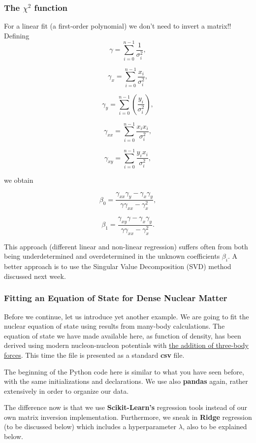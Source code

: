 \documentclass{beamer}
\begin{document}
\begin{frame}
\frametitle{The $\chi^2$ function}

\begin{block}{}

For a linear fit (a first-order polynomial) we don't need to invert a matrix!!  
Defining
\[
\gamma =  \sum_{i=0}^{n-1}\frac{1}{\sigma_i^2},
\]

\[
\gamma_x =  \sum_{i=0}^{n-1}\frac{x_{i}}{\sigma_i^2},
\]

\[
\gamma_y = \sum_{i=0}^{n-1}\left(\frac{y_i}{\sigma_i^2}\right),
\]

\[
\gamma_{xx} =  \sum_{i=0}^{n-1}\frac{x_ix_{i}}{\sigma_i^2},
\]

\[
\gamma_{xy} = \sum_{i=0}^{n-1}\frac{y_ix_{i}}{\sigma_i^2},
\]

we obtain

\[
\beta_0 = \frac{\gamma_{xx}\gamma_y-\gamma_x\gamma_y}{\gamma\gamma_{xx}-\gamma_x^2},
\]

\[
\beta_1 = \frac{\gamma_{xy}\gamma-\gamma_x\gamma_y}{\gamma\gamma_{xx}-\gamma_x^2}.
\]

This approach (different linear and non-linear regression) suffers
often from both being underdetermined and overdetermined in the
unknown coefficients $\beta_i$.  A better approach is to use the
Singular Value Decomposition (SVD) method discussed next week.

\end{block}
\end{frame}

\begin{frame}
\frametitle{Fitting an Equation of State for Dense Nuclear Matter}

Before we continue, let us introduce yet another example. We are going to fit the
nuclear equation of state using results from many-body calculations.
The equation of state we have made available here, as function of
density, has been derived using modern nucleon-nucleon potentials with
\href{{https://www.sciencedirect.com/science/article/pii/S0370157399001106}}{the addition of three-body
forces}. This
time the file is presented as a standard \textbf{csv} file.

The beginning of the Python code here is similar to what you have seen
before, with the same initializations and declarations. We use also
\textbf{pandas} again, rather extensively in order to organize our data.

The difference now is that we use \textbf{Scikit-Learn's} regression tools
instead of our own matrix inversion implementation. Furthermore, we
sneak in \textbf{Ridge} regression (to be discussed below) which includes a
hyperparameter $\lambda$, also to be explained below.
\end{frame}
\end{document}
